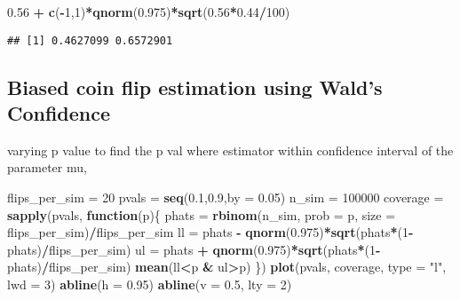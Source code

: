 \documentclass[
]{article}
\newenvironment{Shaded}{\begin{snugshade}}{\end{snugshade}}
\newcommand{\ControlFlowTok}[1]{\textcolor[rgb]{0.13,0.29,0.53}{\textbf{#1}}}
\newcommand{\DataTypeTok}[1]{\textcolor[rgb]{0.13,0.29,0.53}{#1}}
\newcommand{\DecValTok}[1]{\textcolor[rgb]{0.00,0.00,0.81}{#1}}
\newcommand{\FloatTok}[1]{\textcolor[rgb]{0.00,0.00,0.81}{#1}}
\newcommand{\KeywordTok}[1]{\textcolor[rgb]{0.13,0.29,0.53}{\textbf{#1}}}
\newcommand{\NormalTok}[1]{#1}
\newcommand{\OperatorTok}[1]{\textcolor[rgb]{0.81,0.36,0.00}{\textbf{#1}}}
\newcommand{\StringTok}[1]{\textcolor[rgb]{0.31,0.60,0.02}{#1}}
\begin{document}
\begin{Shaded}
\begin{Highlighting}[]
\FloatTok{0.56} \OperatorTok{+}\StringTok{ }\KeywordTok{c}\NormalTok{(}\OperatorTok{-}\DecValTok{1}\NormalTok{,}\DecValTok{1}\NormalTok{)}\OperatorTok{*}\KeywordTok{qnorm}\NormalTok{(}\FloatTok{0.975}\NormalTok{)}\OperatorTok{*}\KeywordTok{sqrt}\NormalTok{(}\FloatTok{0.56}\OperatorTok{*}\FloatTok{0.44}\OperatorTok{/}\DecValTok{100}\NormalTok{)}
\end{Highlighting}
\end{Shaded}

\begin{verbatim}
## [1] 0.4627099 0.6572901
\end{verbatim}

\hypertarget{biased-coin-flip-estimation-using-walds-confidence}{%
\subsection{Biased coin flip estimation using Wald's
Confidence}\label{biased-coin-flip-estimation-using-walds-confidence}}

varying p value to find the p val where estimator within confidence
interval of the parameter mu,

\begin{Shaded}
\begin{Highlighting}[]
\NormalTok{flips_per_sim =}\StringTok{ }\DecValTok{20}
\NormalTok{pvals =}\StringTok{ }\KeywordTok{seq}\NormalTok{(}\FloatTok{0.1}\NormalTok{,}\FloatTok{0.9}\NormalTok{,}\DataTypeTok{by =} \FloatTok{0.05}\NormalTok{)}
\NormalTok{n_sim =}\StringTok{ }\DecValTok{100000}
\NormalTok{coverage =}\StringTok{ }\KeywordTok{sapply}\NormalTok{(pvals, }\ControlFlowTok{function}\NormalTok{(p)\{}
\NormalTok{  phats =}\StringTok{ }\KeywordTok{rbinom}\NormalTok{(n_sim, }\DataTypeTok{prob =}\NormalTok{ p, }\DataTypeTok{size =}\NormalTok{ flips_per_sim)}\OperatorTok{/}\NormalTok{flips_per_sim}
\NormalTok{  ll =}\StringTok{ }\NormalTok{phats }\OperatorTok{-}\StringTok{ }\KeywordTok{qnorm}\NormalTok{(}\FloatTok{0.975}\NormalTok{)}\OperatorTok{*}\KeywordTok{sqrt}\NormalTok{(phats}\OperatorTok{*}\NormalTok{(}\DecValTok{1}\OperatorTok{-}\NormalTok{phats)}\OperatorTok{/}\NormalTok{flips_per_sim)}
\NormalTok{  ul =}\StringTok{ }\NormalTok{phats }\OperatorTok{+}\StringTok{ }\KeywordTok{qnorm}\NormalTok{(}\FloatTok{0.975}\NormalTok{)}\OperatorTok{*}\KeywordTok{sqrt}\NormalTok{(phats}\OperatorTok{*}\NormalTok{(}\DecValTok{1}\OperatorTok{-}\NormalTok{phats)}\OperatorTok{/}\NormalTok{flips_per_sim)}
  \KeywordTok{mean}\NormalTok{(ll}\OperatorTok{<}\NormalTok{p }\OperatorTok{&}\StringTok{ }\NormalTok{ul}\OperatorTok{>}\NormalTok{p)}
\NormalTok{\})}
\KeywordTok{plot}\NormalTok{(pvals, coverage, }\DataTypeTok{type =} \StringTok{"l"}\NormalTok{, }\DataTypeTok{lwd =} \DecValTok{3}\NormalTok{)}
\KeywordTok{abline}\NormalTok{(}\DataTypeTok{h =} \FloatTok{0.95}\NormalTok{)}
\KeywordTok{abline}\NormalTok{(}\DataTypeTok{v =} \FloatTok{0.5}\NormalTok{, }\DataTypeTok{lty =} \DecValTok{2}\NormalTok{)}
\end{Highlighting}
\end{Shaded}
\end{document}
